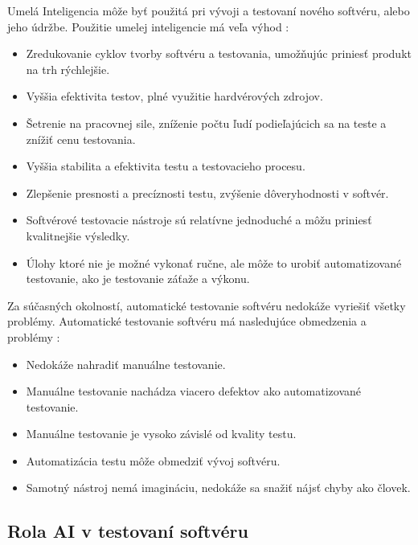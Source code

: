 \documentclass[10pt,twoside,slovak,a4paper]{article}
\begin{document}
 Umelá Inteligencia môže byť použitá pri vývoji a testovaní nového softvéru, alebo jeho údržbe. Použitie umelej inteligencie má veľa výhod \cite{6926420}:
\begin{itemize}
	\item Zredukovanie cyklov tvorby softvéru a testovania, umožňujúc priniesť produkt na trh rýchlejšie.  
	\item Vyššia efektivita testov, plné využitie hardvérových zdrojov. 
	\item Šetrenie na pracovnej sile, zníženie počtu ľudí podieľajúcich sa na teste a znížiť cenu testovania.
    \item Vyššia stabilita a efektivita testu a testovacieho procesu.
    \item Zlepšenie presnosti a precíznosti testu, zvýšenie dôveryhodnosti v softvér.
    \item Softvérové testovacie nástroje sú relatívne jednoduché a môžu priniesť kvalitnejšie výsledky.
    \item Úlohy ktoré nie je možné vykonať ručne, ale môže to urobiť automatizované testovanie, ako je testovanie záťaže a výkonu.
\end{itemize}
Za súčasných okolností, automatické testovanie softvéru nedokáže vyriešiť všetky problémy. Automatické testovanie softvéru má nasledujúce obmedzenia a problémy \cite{6926420}:
\begin{itemize}
	\item Nedokáže nahradiť manuálne testovanie.
	\item Manuálne testovanie nachádza viacero defektov ako automatizované testovanie.
	\item Manuálne testovanie je vysoko závislé od kvality testu.
	\item Automatizácia testu môže obmedziť vývoj softvéru.
	\item Samotný nástroj nemá imagináciu, nedokáže sa snažiť nájsť chyby ako človek.
\end{itemize}

\subsection{Rola AI v testovaní softvéru} \label{rola ai v sw}
\end{document}
